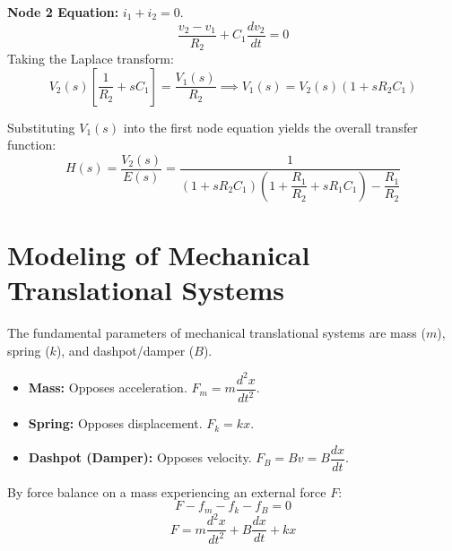 \documentclass[12pt]{article}
\begin{document}
\textbf{Node 2 Equation:}
$i_1 + i_2 = 0$.
\[ \frac{v_2 - v_1}{R_2} + C_1 \frac{dv_2}{dt} = 0  \]
Taking the Laplace transform:
\[ V_2(s) \left[ \frac{1}{R_2} + sC_1 \right] = \frac{V_1(s)}{R_2} \implies V_1(s) = V_2(s)(1 + sR_2C_1)  \]

Substituting $V_1(s)$ into the first node equation yields the overall transfer function:
\[ H(s) = \dfrac{V_2(s)}{E(s)} = \dfrac{1}{(1 + sR_2C_1)\left(1 + \dfrac{R_1}{R_2} + sR_1C_1\right) - \dfrac{R_1}{R_2}}  \]

\section{Modeling of Mechanical Translational Systems}
The fundamental parameters of mechanical translational systems are mass ($m$), spring ($k$), and dashpot/damper ($B$).

\begin{itemize}
    \item \textbf{Mass:} Opposes acceleration. $F_m = m \dfrac{d^2x}{dt^2}$.
    \item \textbf{Spring:} Opposes displacement. $F_k = kx$.
    \item \textbf{Dashpot (Damper):} Opposes velocity. $F_B = Bv = B \dfrac{dx}{dt}$.
\end{itemize}

By force balance on a mass experiencing an external force $F$:
\[ F - f_m - f_k - f_B = 0  \]
\[ F = m\dfrac{d^2x}{dt^2} + B\dfrac{dx}{dt} + kx  \]

\vspace{0.5cm}
\begin{center}
\end{center}
\end{document}
